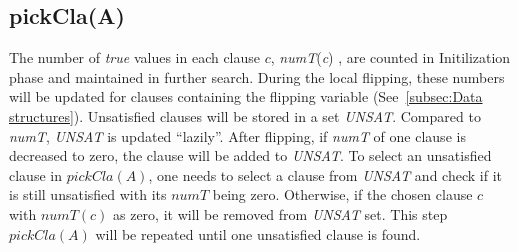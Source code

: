 \documentclass[12pt,a4paper,twoside]{scrartcl}
\numberwithin{equation}{section}
\begin{document}
\subsection{pickCla(A)}
The number of \emph{true} values in each clause $c$, \emph{numT}(\emph{c}) , are counted in Initilization phase and maintained in further search. During the local flipping, these numbers will be updated for clauses containing the flipping variable (See~\ref{subsec:Data structures}).  Unsatisfied clauses will be stored in a set \emph{UNSAT}. Compared to \emph{numT}, \emph{UNSAT} is updated  ``lazily''. After flipping, if \emph{numT} of one clause is decreased to zero, the clause will be added to \emph{UNSAT}.  To select an unsatisfied clause in $pickCla(A)$, one needs to select a clause from \emph{UNSAT} and check if it is still unsatisfied with its $numT$ being zero. Otherwise, if the chosen clause $c$ with $numT(c)$ as zero, it will be removed from \emph{UNSAT} set. This step $pickCla(A)$ will be repeated until one unsatisfied clause is found.\\ 
\\
\end{document}
